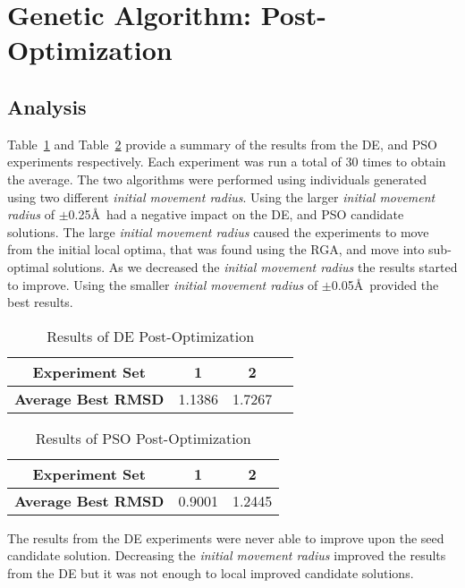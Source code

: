 \section{Genetic Algorithm: Post-Optimization}
\label{sec:post-op-analysis}

\subsection{Analysis}

Table~\ref{table:post-op-de-results} and Table~\ref{table:post-op-pso-results} provide a summary of the results from the DE, and PSO experiments respectively. Each experiment was run a total of 30 times to obtain the average. The two algorithms were performed using individuals generated using two different \textit{initial movement radius}. Using the larger \textit{initial movement radius} of $\pm$0.25\AA\ had a negative impact on the DE, and PSO candidate solutions. The large \textit{initial movement radius} caused the experiments to move from the initial local optima, that was found using the RGA, and move into sub-optimal solutions. As we decreased the \textit{initial movement radius} the results started to improve. Using the smaller \textit{initial movement radius} of $\pm$0.05\AA\ provided the best results.

\begin{table}
	\centering
	\begin{tabular}{ | >{\bfseries}c | c | c | c | }
		\hline
		Experiment Set & 1 & 2 \\ \hline
		Average Best RMSD & 1.1386 &1.7267  \\ \hline
	\end{tabular}
	\caption{Results of DE Post-Optimization}
	\label{table:post-op-de-results}
\end{table}

\begin{table}
	\centering
	\begin{tabular}{ | >{\bfseries}c | c | c | }
		\hline
		Experiment Set & 1 & 2 \\ \hline
		Average Best RMSD & 0.9001 & 1.2445 \\ \hline
	\end{tabular}
	\caption{Results of PSO Post-Optimization}
	\label{table:post-op-pso-results}
\end{table}

The results from the DE experiments were never able to improve upon the seed candidate solution. Decreasing the \textit{initial movement radius} improved the results from the DE but it was not enough to local improved candidate solutions.

